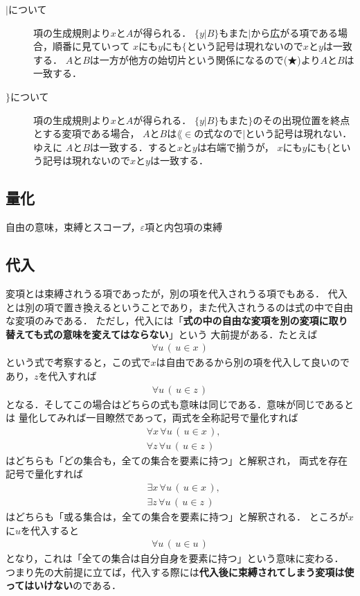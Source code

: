 \begin{description}
		\item[$|$について]
			項の生成規則より$x$と$A$が得られる．
			$\{y|B\}$もまた$|$から広がる項である場合，順番に見ていって
			$x$にも$y$にも$\{$という記号は現れないので$x$と$y$は一致する．
			$A$と$B$は一方が他方の始切片という関係になるので(★)より$A$と$B$は一致する．
			
		\item[$\}$について]
			項の生成規則より$x$と$A$が得られる．
			$\{y|B\}$もまた$\}$のその出現位置を終点とする変項である場合，
			$A$と$B$は$\lang{\in}$の式なので$|$という記号は現れない．ゆえに
			$A$と$B$は一致する．すると$x$と$y$は右端で揃うが，
			$x$にも$y$にも$\{$という記号は現れないので$x$と$y$は一致する．
	\end{description}
	
\subsection{量化}
	自由の意味，束縛とスコープ，$\varepsilon$項と内包項の束縛
	
\subsection{代入}
	変項とは束縛されうる項であったが，別の項を代入されうる項でもある．
	代入とは別の項で置き換えるということであり，また代入されうるのは式の中で自由な変項のみである．
	ただし，代入には「{\bf 式の中の自由な変項を別の変項に取り替えても式の意味を変えてはならない}」という
	大前提がある．たとえば
	\begin{align}
		\forall u\, (\, u \in x\, )
	\end{align}
	という式で考察すると，この式で$x$は自由であるから別の項を代入して良いのであり，$z$を代入すれば
	\begin{align}
		\forall u\, (\, u \in z\, )
	\end{align}
	となる．そしてこの場合はどちらの式も意味は同じである．意味が同じであるとは
	量化してみれば一目瞭然であって，両式を全称記号で量化すれば
	\begin{align}
		&\forall x\, \forall u\, (\, u \in x\, ), \\
		&\forall z\, \forall u\, (\, u \in z\, )
	\end{align}
	はどちらも「どの集合も，全ての集合を要素に持つ」と解釈され，
	両式を存在記号で量化すれば
	\begin{align}
		&\exists x\, \forall u\, (\, u \in x\, ), \\
		&\exists z\, \forall u\, (\, u \in z\, )
	\end{align}
	はどちらも「或る集合は，全ての集合を要素に持つ」と解釈される．
	ところが$x$に$u$を代入すると
	\begin{align}
		\forall u\, (\, u \in u\, )
	\end{align}
	となり，これは「全ての集合は自分自身を要素に持つ」という意味に変わる．
	つまり先の大前提に立てば，代入する際には{\bf 代入後に束縛されてしまう変項は使ってはいけない}のである．
	
